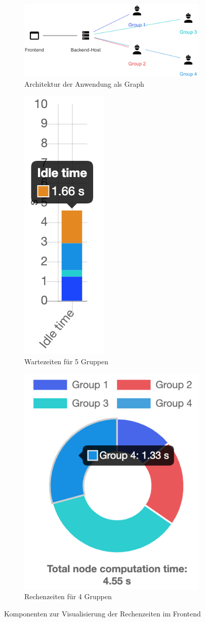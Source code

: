 \begin{figure}[t!]
	\begin{subfigure}[t]{0.3\textwidth}
		\centering
		\includegraphics[width=\linewidth]{img/Implementierung/NetworkView}
		\caption{Architektur der Anwendung als Graph
		}\label{fig:networkView}
	\end{subfigure}
	\begin{subfigure}[t]{0.3\textwidth}
		\centering
		\includegraphics[height=.5\linewidth]{img/Implementierung/IdleTime}
		\caption{Wartezeiten für 5 Gruppen}
		\label{fig:idleTime}
	\end{subfigure}%
	\begin{subfigure}[t]{0.3\textwidth}
		\centering
		\includegraphics[height=.5\linewidth]{img/Implementierung/ComputationTime}
		\caption{Rechenzeiten für 4 Gruppen}
		\label{fig:computationTime}
	\end{subfigure}
	\caption{Komponenten zur Visualisierung der Rechenzeiten im Frontend}
\end{figure}


